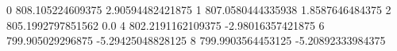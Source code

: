 0 808.105224609375 2.90594482421875
1 807.0580444335938 1.8587646484375
2 805.1992797851562 0.0
4 802.2191162109375 -2.98016357421875
6 799.905029296875 -5.29425048828125
8 799.9903564453125 -5.20892333984375
